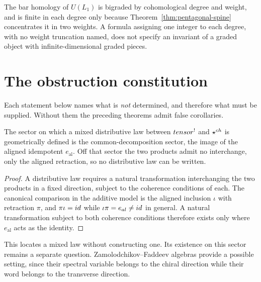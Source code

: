 \begin{remark}
The bar homology of $U(L_1)$ is bigraded by cohomological degree and weight,
and is finite in each degree only because Theorem~\ref{thm:pentagonal-spine}
concentrates it in two weights. A formula assigning one integer to each degree,
with no weight truncation named, does not specify an invariant of a graded
object with infinite-dimensional graded pieces.
\end{remark}

\chapter{The obstruction constitution}
\label{ch:obstructions}

Each statement below names what is \emph{not} determined, and therefore what
must be supplied. Without them the preceding theorems admit false corollaries.

\begin{proposition}
\label{prop:lambda-sector-spine}
The sector on which a mixed distributive law between $tensor^!$ and $\mathbin{\star^{ch}}$
is geometrically defined is the common-decomposition sector, the image of the
aligned idempotent $e_{\mathrm{al}}$. Off that sector the two products admit no
interchange, only the aligned retraction, so no distributive law can be
written.
\end{proposition}
\begin{proof}
A distributive law requires a natural transformation interchanging the two
products in a fixed direction, subject to the coherence conditions of each. The
canonical comparison in the additive model is the aligned inclusion $\iota$ with
retraction $\pi$, and $\pi\iota=id$ while $\iota\pi=e_{al}\ne id$ in
general. A natural transformation subject to both coherence conditions
therefore exists only where $e_{\mathrm{al}}$ acts as the identity.
\end{proof}

This locates a mixed law without constructing one. Its existence on this sector
remains a separate question. Zamolodchikov--Faddeev algebras provide a possible
setting, since their spectral variable belongs to the chiral direction while
their word belongs to the transverse direction.

